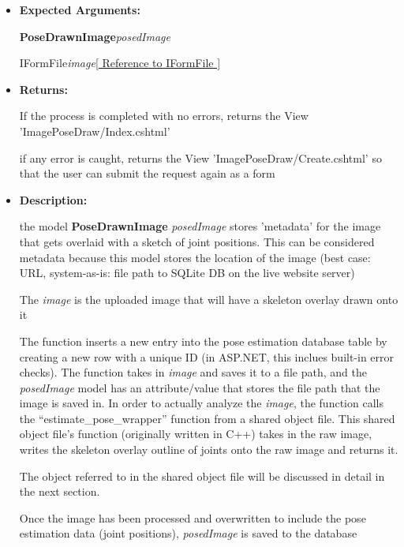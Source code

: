\documentclass{scrreprt}
\begin{document}
\begin{itemize}
        \item \textbf{Expected Arguments:}

                \textbf{PoseDrawnImage}\quad\textit{posedImage}

                IFormFile\quad\textit{image}\quad\quad\quad\href{https://docs.microsoft.com/en-us/aspnet/core/api/microsoft.aspnetcore.http.iformfile}{[
                        Reference to IFormFile ]}

        \item \textbf{Returns:}

                If the process is completed with no errors, returns the View
                'ImagePoseDraw/Index.cshtml'

                if any error is caught, returns the View
                'ImagePoseDraw/Create.cshtml' so that the user can submit the
                request again as a form

        \item \textbf{Description:}

                the model \textbf{PoseDrawnImage} \textit{posedImage} stores
                'metadata' for the image that gets overlaid with a sketch of
                joint positions. This can be considered metadata because this
                model stores the location of the image (best case: URL,
                system-as-is: file path to SQLite DB on the live website
                server)

                The \textit{image} is the uploaded image that will have a
                skeleton overlay drawn onto it

                The function inserts a new entry into the pose estimation
                database table by creating a new row with a unique ID (in
                ASP.NET, this inclues built-in error checks). The function
                takes in \textit{image} and saves it to a file path, and the
                \textit{posedImage} model has an attribute/value that stores
                the file path that the image is saved in. In order to actually
                analyze the \textit{image}, the function calls the
                ``estimate\_pose\_wrapper'' function from a shared object file.
                This shared object file's function (originally written in C++)
                takes in the raw image, writes the skeleton overlay outline of
                joints onto the raw image and returns it.

                The object referred to in the shared object file will be
                discussed in detail in the next section.

                Once the image has been processed and overwritten to include
                the pose estimation data (joint positions), \textit{posedImage}
                is saved to the database
\end{itemize}
\end{document}
